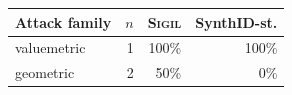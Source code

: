 \begin{tabular}{lrrr}
\toprule
Attack family & $n$ & \textsc{Sigil} & SynthID-st. \\
\midrule
valuemetric & 1 & 100\% & 100\% \\
geometric & 2 & 50\% & 0\% \\
\bottomrule
\end{tabular}
